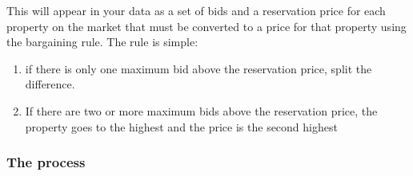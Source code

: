 This will appear in your data as a set of bids and a reservation price for each property on the market that must be converted to a price for that property using the bargaining rule. The rule is simple: 
\begin{enumerate}
    \item if there is only one maximum bid above the reservation price, split the difference.

    \item If there are two or more maximum bids above the reservation price, the property goes to the highest  and the price is the second highest
\end{enumerate}

\subsubsection{The process}
